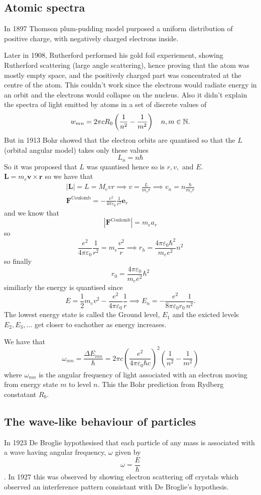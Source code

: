 \documentclass{article}
\begin{document}
\subsection{Atomic spectra}
In 1897 Thomson plum-pudding model purposed a uniform distribution of positive charge, with negatively charged electrons inside.\par
Later in 1908, Rutherford performed his gold foil experiement, showing Rutherford scattering (large angle scattering), hence proving that the atom was mostly empty space, and the positively charged part was concentrated at the centre of the atom. This couldn't work since the electrons would radiate energy in an orbit and the electrons would collapse on the nucleus. Also it didn't explain the spectra of light emitted by atoms in a set of discrete values of 
\[
	w_{mn}=2\pi c R_0\left(\frac 1 {n^2}-\frac 1{m^2}\right)\quad n,m\in \mathbb{N}.
\]
But in 1913 Bohr showed that the electron orbits are quantised so that the $ L $ (orbital angular model) takes only these values
\[
  L_n=n\hbar
\]
So it was proposed that $ L $ was quantised hence so is $ r, v, $ and $ E $.\\
\pf $ \mathbf L = m_e\mathbf v \times \mathbf r$ so we have that
\begin{align*}
	|\mathbf L| = L = M_e v r \implies v=\frac{L}{m_er}\implies v_n=n\frac{\hbar}{m_er}\\
	\mathbf F^{\text{Coulomb}}=-\frac{e^2}{4\pi\varepsilon_0}\frac1{r^2}\mathbf e_r
\end{align*}
and we know that
\[
	|\mathbf F^{\text{Coulomb}}|=m_ea_r
\]
so
\[
	\frac{e^2}{4\pi\varepsilon_0}\frac{1}{r^2}=m_e\frac{v^2}r\implies r_h=\frac{4\pi\varepsilon_0\hbar^2}{m_ee^2}n^2
\]
so finally
\[
	r_0=\frac{4\pi\varepsilon_0}{m_ee^2}\hbar^2
\]
similiarly the energy is quantised since
\[
	E=\frac 12 m_ev^2-\frac{e^2}{4\pi\varepsilon_0}\frac 1r\implies E_n=-\frac{e^2}{8\pi \varepsilon_0r_0}\frac{1}{n^2}.
\]
The lowest energy state is called the Ground level, $ E_1 $ and the exicted levels $ E_2,E_3,\dots $ get closer to eachother as energy increases.\par
We have that
\[
	\omega_{mn}=\frac{\Delta E_{mn}}{\hbar}=2\pi c\left(\frac{e^2}{4\pi\varepsilon_0\hbar c}\right)^2\left(\frac{1}{n^2}-\frac1{m^2}\right)
\]
where $ \omega_{mn} $ is the angular frequency of light associated with an electron moving from energy state $ m $ to level $ n $. This the Bohr prediction from Rydberg constatant $ R_0 $. 
\subsection{The wave-like behaviour of particles}
In 1923 De Broglie hypothesised that each particle of any mass is associated with a wave having angular frequency, $ \omega $ given by
\[ \omega=\frac E\hbar \].
In 1927 this was observed by showing electron scattering off crystals which observed an interference pattern consistant with De Broglie's hypothesis.
\end{document}
